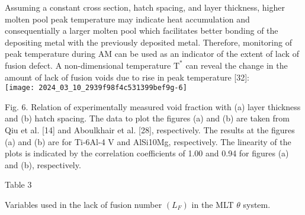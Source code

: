 \documentclass[10pt]{article}
\begin{document}
Assuming a constant cross section, hatch spacing, and layer thickness, higher molten pool peak temperature may indicate heat accumulation and consequentially a larger molten pool which facilitates better bonding of the depositing metal with the previously deposited metal. Therefore, monitoring of peak temperature during AM can be used as an indicator of the extent of lack of fusion defect. A non-dimensional temperature $\mathrm{T}^{*}$ can reveal the change in the amount of lack of fusion voids due to rise in peak temperature [32]:\\
\texttt{[image: 2024\_03\_10\_2939f98f4c531399bef9g-6]}

Fig. 6. Relation of experimentally measured void fraction with (a) layer thickness and (b) hatch spacing. The data to plot the figures (a) and (b) are taken from Qiu et al. [14] and Aboulkhair et al. [28], respectively. The results at the figures (a) and (b) are for Ti-6Al-4 V and AlSi10Mg, respectively. The linearity of the plots is indicated by the correlation coefficients of 1.00 and 0.94 for figures (a) and (b), respectively.

Table 3

Variables used in the lack of fusion number $\left(L_{F}\right)$ in the MLT $\theta$ system.
\end{document}
